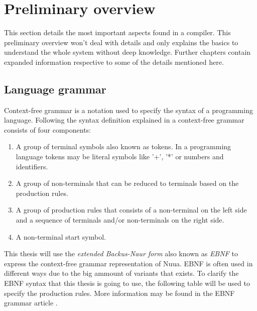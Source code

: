 \section{Preliminary overview}

This section details the most important aspects found in a compiler.
This preliminary overview won't deal with details and only explains the basics to understand the whole system without deep knowledge.
Further chapters contain expanded information respective to some of the details mentioned here.

\subsection{Language grammar}

Context-free grammar is a notation used to specify the syntax of a programming language. Following the syntax definition explained
in \autocite[Section~2.2]{compilers} a context-free grammar consists of four components:

\begin{enumerate}
    \item A group of terminal symbols also known as tokens. In a programming language tokens may be literal symbols like '+', '*' or numbers and identifiers.
    \item A group of non-terminals that can be reduced to terminals based on the production rules.
    \item A group of production rules that consists of a non-terminal on the left side and a sequence of terminals and/or non-terminals on the right side.
    \item A non-terminal start symbol.
\end{enumerate}

This thesis will use the \emph{extended Backus-Naur form} also known as \emph{EBNF} to express the context-free grammar representation of Nuua.
EBNF is often used in different ways due to the big ammount of variants that exists. To clarify the EBNF syntax that this thesis is going to use, the
following table will be used to specify the production rules. More information may be found in the EBNF grammar article \autocite{EBNF_grammar}.


